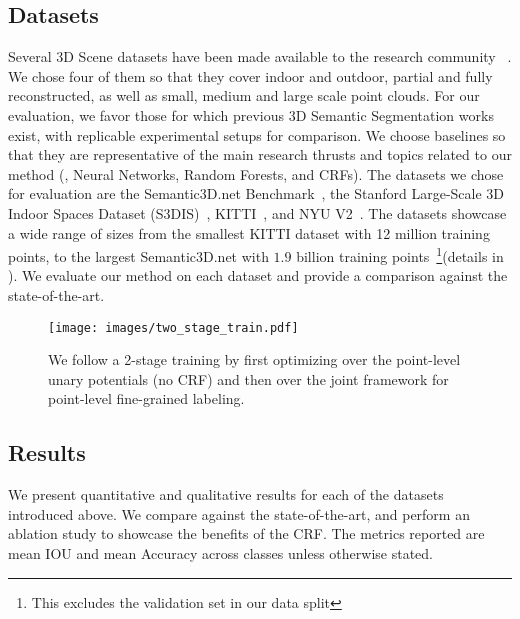 \documentclass[10pt,twocolumn,letterpaper]{article}
\newcommand{\fccrf}[0]{CRF\xspace}
\begin{document}
\subsection{Datasets}
\label{sec:datasets}

Several 3D Scene datasets have been made available to the research community ~\cite{Riemenschneider2014,armeni2017,Armeni2016, scenenn-3dv16, Song2015,Xiao2013,Silberman:ECCV12,dai2017scannet,kitchen2016, catdata2013}. We chose four of them so that they cover indoor and outdoor, partial and fully reconstructed, as well as small, medium and large scale point clouds. For our evaluation, we favor those for which previous 3D Semantic Segmentation works exist, with replicable experimental setups for comparison. We choose baselines so that they are representative of the main research thrusts and topics related to our method (\ie, Neural Networks, Random Forests, and CRFs). The datasets we chose for evaluation are the Semantic3D.net Benchmark~\cite{l3d},
the Stanford Large-Scale 3D Indoor Spaces Dataset (S3DIS)~\cite{Armeni2016},  KITTI~\cite{Geiger2013IJRR,Geiger:2012:WRA:2354409.2354978}, and NYU V2~\cite{Silberman:ECCV12}.
The datasets showcase a wide range of sizes from the smallest
KITTI dataset with 12 million
training points, to the largest Semantic3D.net with $1.9$ billion training points~\footnote{This excludes the validation set in our data split}(details in \cite{segcloudsuppl}). We evaluate our method on each dataset and provide a comparison against the state-of-the-art.


\begin{figure}[t]
\centering
\texttt{[image: images/two\_stage\_train.pdf]}
\caption{\small{We follow a 2-stage training by first optimizing over the point-level unary potentials (no CRF) and then over the joint framework for point-level fine-grained labeling.}}
\label{fig:training_stages}
\vspace{-4mm}
\end{figure}

\subsection{Results}
\label{sec:results}

We present quantitative and qualitative results for each of the datasets introduced above. We compare against the state-of-the-art, and perform an ablation study to showcase the benefits of the \fccrf. The metrics reported are mean IOU and mean Accuracy across classes unless otherwise stated.\\
\end{document}
